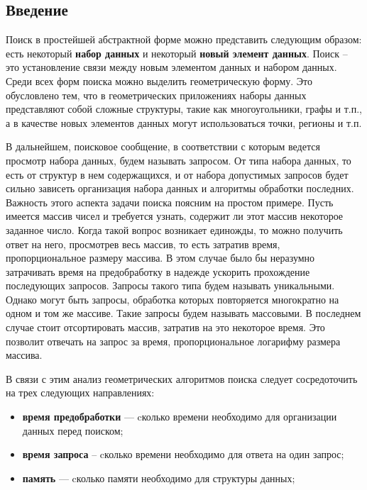 
\subsection{Введение}

Поиск в простейшей абстрактной форме можно представить следующим образом: есть некоторый \textbf{набор данных} и некоторый \textbf{новый элемент данных}. Поиск – это установление связи между новым элементом данных и набором данных. Среди всех форм поиска можно выделить геометрическую форму. Это обусловлено тем, что в геометрических приложениях наборы данных представляют собой сложные структуры, такие как многоугольники, графы и т.п., а в качестве новых элементов данных могут использоваться точки, регионы и т.п.

В дальнейшем, поисковое сообщение, в соответствии с которым ведется просмотр набора данных, будем называть запросом. От типа набора данных, то есть от структур в нем содержащихся, и от набора допустимых запросов будет сильно зависеть организация набора данных и алгоритмы обработки последних. Важность этого аспекта задачи поиска поясним на простом примере. Пусть имеется массив чисел и требуется узнать, содержит ли этот массив некоторое заданное число. Когда такой вопрос возникает единожды, то можно получить ответ на него, просмотрев весь массив, то есть затратив время, пропорциональное размеру массива. В этом случае было бы неразумно затрачивать время на предобработку в надежде ускорить прохождение последующих запросов. Запросы такого типа будем называть уникальными. Однако могут быть запросы, обработка которых повторяется многократно на одном и том же массиве. Такие запросы будем называть массовыми. В последнем случае стоит отсортировать массив, затратив на это некоторое время. Это позволит отвечать на запрос за время, пропорциональное логарифму размера массива.

В связи с этим анализ геометрических алгоритмов поиска следует сосредоточить на трех следующих направлениях:
\begin{itemize}
    \item \textbf{время предобработки} --- cколько времени необходимо для организации данных перед поиском;
    \item \textbf{время запроса} -- cколько времени необходимо для ответа на один запрос;
    \item \textbf{память} --- cколько памяти необходимо для структуры данных;
\end{itemize}

